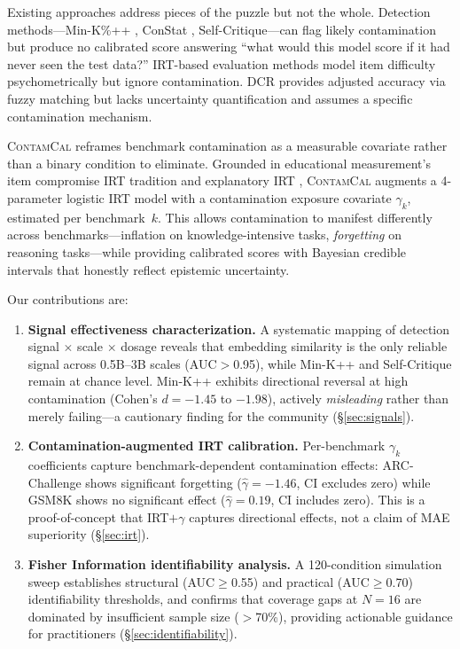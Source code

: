 \documentclass[11pt,a4paper]{article}
\newcommand{\ghat}{\hat{\gamma}}
\newcommand{\contamcal}{\textsc{ContamCal}}
\begin{document}
Existing approaches address pieces of the puzzle but not the whole. Detection methods---Min-K\%++ \cite{shi2024detecting}, ConStat \cite{dekoninck2024constat}, Self-Critique---can flag likely contamination but produce no calibrated score answering ``what would this model score if it had never seen the test data?'' IRT-based evaluation methods \cite{lalor2024aaai,polo2024tinybenchmarks} model item difficulty psychometrically but ignore contamination. DCR \cite{oren2024dcr} provides adjusted accuracy via fuzzy matching but lacks uncertainty quantification and assumes a specific contamination mechanism.

\contamcal{} reframes benchmark contamination as a measurable covariate rather than a binary condition to eliminate. Grounded in educational measurement's item compromise IRT tradition \cite{eckerly2017detecting,sinharay2017detection} and explanatory IRT \cite{deboeck2004explanatory}, \contamcal{} augments a 4-parameter logistic IRT model with a contamination exposure covariate $\gamma_k$, estimated per benchmark~$k$. This allows contamination to manifest differently across benchmarks---inflation on knowledge-intensive tasks, \emph{forgetting} on reasoning tasks---while providing calibrated scores with Bayesian credible intervals that honestly reflect epistemic uncertainty.

Our contributions are:
\begin{enumerate}
\item \textbf{Signal effectiveness characterization.} A systematic mapping of detection signal $\times$ scale $\times$ dosage reveals that embedding similarity is the only reliable signal across 0.5B--3B scales (AUC$>$0.95), while Min-K++ and Self-Critique remain at chance level. Min-K++ exhibits directional reversal at high contamination (Cohen's $d = -1.45$ to $-1.98$), actively \emph{misleading} rather than merely failing---a cautionary finding for the community (\S\ref{sec:signals}).

\item \textbf{Contamination-augmented IRT calibration.} Per-benchmark $\gamma_k$ coefficients capture benchmark-dependent contamination effects: ARC-Challenge shows significant forgetting ($\ghat=-1.46$, CI excludes zero) while GSM8K shows no significant effect ($\ghat=0.19$, CI includes zero). This is a proof-of-concept that IRT$+\gamma$ captures directional effects, not a claim of MAE superiority (\S\ref{sec:irt}).

\item \textbf{Fisher Information identifiability analysis.} A 120-condition simulation sweep establishes structural (AUC$\geq$0.55) and practical (AUC$\geq$0.70) identifiability thresholds, and confirms that coverage gaps at $N{=}16$ are dominated by insufficient sample size ($>$70\%), providing actionable guidance for practitioners (\S\ref{sec:identifiability}).
\end{enumerate}
\end{document}
